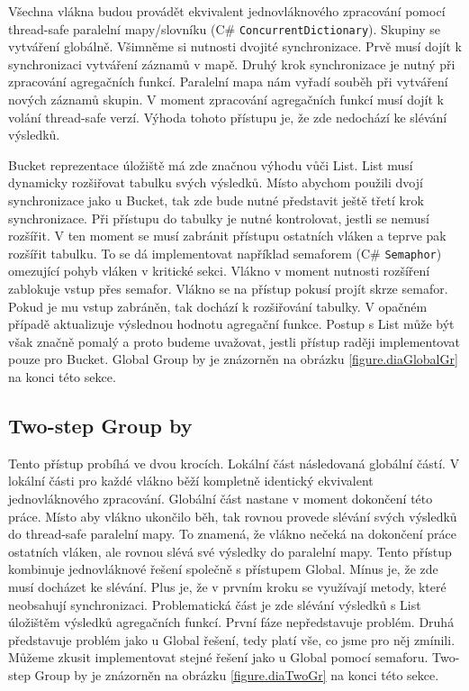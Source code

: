 Všechna vlákna budou provádět ekvivalent jednovláknového zpracování pomocí thread-safe paralelní mapy/slovníku (C\# \texttt{ConcurrentDictionary}).
Skupiny se vytváření globálně.
Všimněme si nutnosti dvojité synchronizace.
Prvě musí dojít k synchronizaci vytváření záznamů v mapě.
Druhý krok synchronizace je nutný při zpracování agregačních funkcí.
Paralelní mapa nám vyřadí souběh při vytváření nových záznamů skupin.
V moment zpracování agregačních funkcí musí dojít k volání thread-safe verzí.
Výhoda tohoto přístupu je, že zde nedochází ke slévání výsledků.

Bucket reprezentace úložiště má zde značnou výhodu vůči List.
List musí dynamicky rozšiřovat tabulku svých výsledků.
Místo abychom použili dvojí synchronizace jako u Bucket, tak zde bude nutné představit ještě třetí krok synchronizace.
Při přístupu do tabulky je nutné kontrolovat, jestli se nemusí rozšířit.
V ten moment se musí zabránit přístupu ostatních vláken a teprve pak rozšířit tabulku.
To se dá implementovat například semaforem (C\# \texttt{Semaphor}) omezující pohyb vláken v kritické sekci.
Vlákno v moment nutnosti rozšíření zablokuje vstup přes semafor.
Vlákno se na přístup pokusí projít skrze semafor.
Pokud je mu vstup zabráněn, tak dochází k rozšiřování tabulky.
V opačném případě aktualizuje výslednou hodnotu agregační funkce.
Postup s List může být však značně pomalý a proto budeme uvažovat, jestli přístup raději implementovat pouze pro Bucket.
Global Group by je znázorněn na obrázku \ref{figure.diaGlobalGr} na konci této sekce.

\subsection{Two-step Group by} \label{anal.groupby.twostep}

Tento přístup probíhá ve dvou krocích.
Lokální část následovaná globální částí. 
V lokální části pro každé vlákno běží kompletně identický ekvivalent jednovláknového zpracování.
Globální část nastane v moment dokončení této práce.
Místo aby vlákno ukončilo běh, tak rovnou provede slévání svých výsledků do thread-safe paralelní mapy.
To znamená, že vlákno nečeká na dokončení práce ostatních vláken, ale rovnou slévá své výsledky do paralelní mapy.
Tento přístup kombinuje jednovláknové řešení společně s přístupem Global.
Mínus je, že zde musí docházet ke slévání.
Plus je, že v prvním kroku se využívají metody, které neobsahují synchronizaci. 
Problematická část je zde slévání výsledků s List úložištěm výsledků agregačních funkcí.
První fáze nepředstavuje problém. 
Druhá představuje problém jako u Global řešení, tedy platí vše, co jsme pro něj zmínili.
Můžeme zkusit implementovat stejné řešení jako u Global pomocí semaforu.
Two-step Group by je znázorněn na obrázku \ref{figure.diaTwoGr} na konci této sekce.

